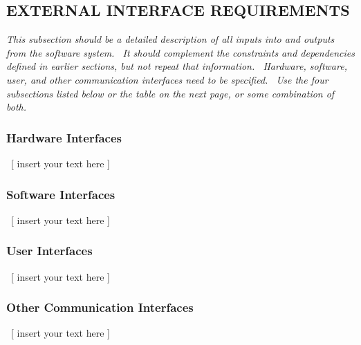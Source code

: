 \documentclass[twoside,letterpaper]{article}
\begin{document}
\subsection[EXTERNAL INTERFACE
REQUIREMENTS]{\rmfamily\bfseries\color{black}
EXTERNAL INTERFACE REQUIREMENTS}
{\itshape\color{black}
This subsection should be a detailed description of all inputs into and
outputs from the software system. \ It should complement the
constraints and dependencies defined in earlier sections, but not
repeat that information. \ Hardware, software, user, and other
communication interfaces need to be specified. \ Use the four
subsections listed below or the table on the next page, or some
combination of both.}

\subsubsection[Hardware
Interfaces]{\rmfamily\bfseries\color{black}
Hardware Interfaces}
{\color{black}
\foreignlanguage{english}{\ }\foreignlanguage{english}{[ insert your
text here ]}}

\subsubsection[Software
Interfaces]{\rmfamily\bfseries\color{black}
Software Interfaces}
{\color{black}
\foreignlanguage{english}{\ }\foreignlanguage{english}{[ insert your
text here ]}}

\subsubsection[User
Interfaces]{\rmfamily\bfseries\color{black}
User Interfaces}
{\color{black}
\foreignlanguage{english}{\ }\foreignlanguage{english}{[ insert your
text here ]}}

\subsubsection[Other Communication
Interfaces]{\rmfamily\bfseries\color{black}
Other Communication Interfaces}
{\color{black}
\foreignlanguage{english}{\ }\foreignlanguage{english}{[ insert your
text here ]}}


\bigskip
\end{document}
